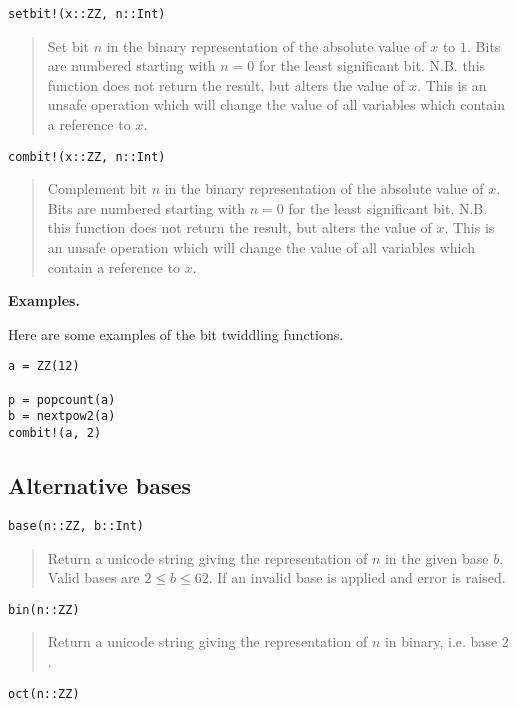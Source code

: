 \documentclass[a4paper,10pt]{article}
\newcommand{\desc}[1]{\vspace{-3mm}\begin{quote}#1\end{quote}}
\begin{document}
{{{\begin{lstlisting}
setbit!(x::ZZ, n::Int)
\end{lstlisting}

\desc{Set bit $n$ in the binary representation of the absolute value of $x$ to $1$. Bits
are numbered starting with $n = 0$ for the least significant bit. N.B. this function does
not return the result, but alters the value of $x$. This is an unsafe operation which will
change the value of all variables which contain a reference to $x$.}

\begin{lstlisting}
combit!(x::ZZ, n::Int)
\end{lstlisting}

\desc{Complement bit $n$ in the binary representation of the absolute value of $x$. Bits
are numbered starting with $n = 0$ for the least significant bit. N.B. this function does
not return the result, but alters the value of $x$. This is an unsafe operation which will
change the value of all variables which contain a reference to $x$.}

\textbf{Examples.}

Here are some examples of the bit twiddling functions.

\begin{lstlisting}
a = ZZ(12)

p = popcount(a)
b = nextpow2(a)
combit!(a, 2)
\end{lstlisting}

\subsection{Alternative bases}

\begin{lstlisting}
base(n::ZZ, b::Int)
\end{lstlisting}

\desc{Return a unicode string giving the representation of $n$ in the given base $b$. Valid
bases are $2 \leq b \leq 62$. If an invalid base is applied and error is raised.}

\begin{lstlisting}
bin(n::ZZ)
\end{lstlisting}

\desc{Return a unicode string giving the representation of $n$ in binary, i.e. base $2$.}

\begin{lstlisting}
oct(n::ZZ)
\end{lstlisting}

}}}
\end{document}
